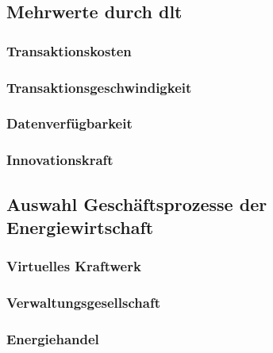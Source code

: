 \subsection{Mehrwerte durch \acl{dlt}}

\subsubsection{Transaktionskosten}

\subsubsection{Transaktionsgeschwindigkeit}

\subsubsection{Datenverfügbarkeit}

\subsubsection{Innovationskraft}

\subsection{Auswahl Geschäftsprozesse der Energiewirtschaft}

\subsubsection{Virtuelles Kraftwerk}

\subsubsection{Verwaltungsgesellschaft}

\subsubsection{Energiehandel}

\newpage